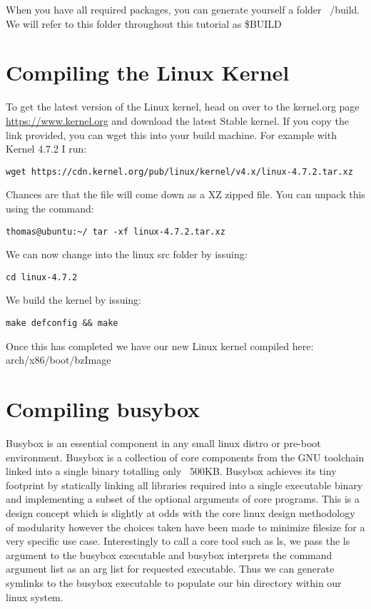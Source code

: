 \documentclass[twocolumn]{article}
\begin{document}
When you have all required packages, you can generate yourself a folder ~/build. We will refer to this folder throughout this tutorial as \$BUILD

\section{Compiling the Linux Kernel}

To get the latest version of the Linux kernel, head on over to the kernel.org page \url{https://www.kernel.org} and download the latest Stable kernel. If you copy the link provided, you can wget this into your build machine. For example with Kernel 4.7.2 I run:
\begin{lstlisting}
wget https://cdn.kernel.org/pub/linux/kernel/v4.x/linux-4.7.2.tar.xz
\end{lstlisting}
Chances are that the file will come down as a XZ zipped file. You can unpack this using the command:
\begin{lstlisting}
thomas@ubuntu:~/ tar -xf linux-4.7.2.tar.xz
\end{lstlisting}
We can now change into the linux src folder by issuing:
\begin{lstlisting}
cd linux-4.7.2
\end{lstlisting}
We build the kernel by issuing:
\begin{lstlisting}
make defconfig && make
\end{lstlisting}
Once this has completed we have our new Linux kernel compiled here: arch/x86/boot/bzImage


\section{Compiling busybox}

Busybox is an essential component in any small linux distro or pre-boot environment. Busybox is a collection of core components from the GNU toolchain linked into a single binary totalling only ~500KB. Busybox achieves its tiny footprint by statically linking all libraries required into a single executable binary and implementing a subset of the optional arguments of core programs. This is a design concept which is slightly at odds with the core linux design methodology of modularity however the choices taken have been made to minimize filesize for a very specific use case. Interestingly to call a core tool such as ls, we pass the ls argument to the busybox executable and busybox interprets the command argument list as an arg list for requested executable. Thus we can generate symlinks to the busybox executable to populate our bin directory within our linux system.
\end{document}
